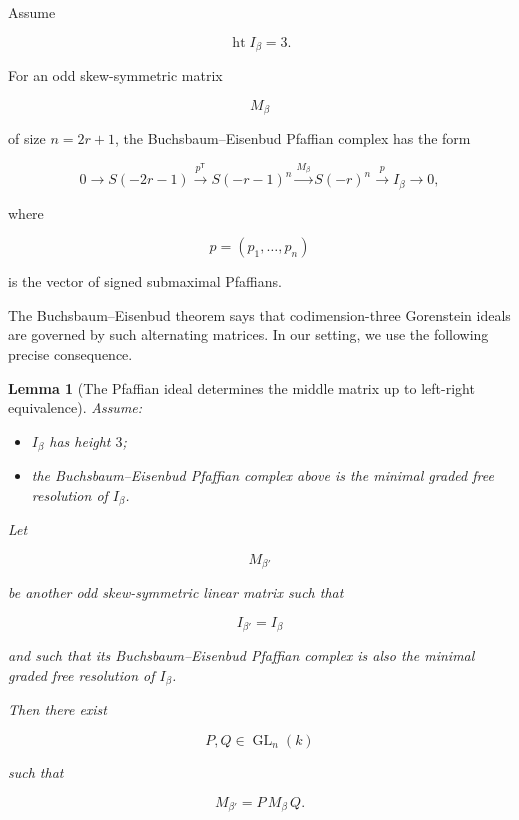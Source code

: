 \documentclass[11pt]{article}
\newtheorem{lemma}[theorem]{Lemma}
\begin{document}
Assume

\[
\operatorname{ht}I_\beta=3.
\]

For an odd skew-symmetric matrix

\[
M_\beta
\]

of size $n=2r+1$, the Buchsbaum--Eisenbud Pfaffian complex has the form

\[
0
\longrightarrow
S(-2r-1)
\xrightarrow{p^{\mathsf T}}
S(-r-1)^n
\xrightarrow{M_\beta}
S(-r)^n
\xrightarrow{p}
I_\beta
\longrightarrow0,
\]

where

\[
p=(p_1,\ldots,p_n)
\]

is the vector of signed submaximal Pfaffians.

The Buchsbaum--Eisenbud theorem says that codimension-three Gorenstein ideals are governed by such alternating matrices. In our setting, we use the following precise consequence.

\begin{lemma}[The Pfaffian ideal determines the middle matrix up to left-right equivalence]

Assume:

\begin{itemize}
\item $I_\beta$ has height $3$;
\end{itemize}

\begin{itemize}
\item the Buchsbaum--Eisenbud Pfaffian complex above is the minimal graded free resolution of $I_\beta$.
\end{itemize}

Let

\[
M_{\beta'}
\]

be another odd skew-symmetric linear matrix such that

\[
I_{\beta'}=I_\beta
\]

and such that its Buchsbaum--Eisenbud Pfaffian complex is also the minimal graded free resolution of $I_\beta$.

Then there exist

\[
P,Q\in \operatorname{GL}_n(k)
\]

such that

\[
M_{\beta'}=P\,M_\beta\,Q.
\]

\end{lemma}
\end{document}
